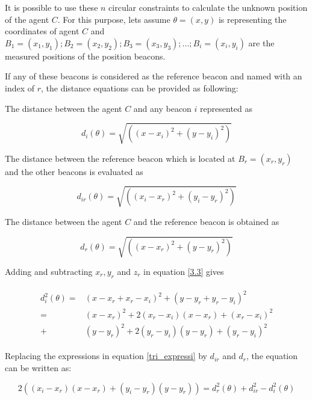 It is possible to use these $n$ circular constraints to calculate the unknown position of the agent $C$. For this purpose, lets assume $\theta = (x,y)$ is representing the coordinates of agent $C$ and $B_1 = (x_1,y_1) ; B_2 = (x_2,y_2) ; B_3 = (x_3,y_3) ; ...  ; B_i = (x_i,y_i)$ are the measured positions of the position beacons.

If any of these beacons is considered as the reference beacon and named with an index of $r$, the distance equations can be provided as following:

The distance between the agent $C$ and any beacon $i$ represented as

\begin{equation} \label{3.3}
d_i(\theta) = \sqrt{\left((x - x_i)^2 + (y - y_i)^2\right)}
\end{equation}

The distance between the reference beacon which is located at $B_r = (x_r,y_r)$ and the other beacons is evaluated as

\begin{equation}
d_{ir}(\theta) = \sqrt{\left((x_i - x_r)^2 + (y_i - y_r)^2\right)}
\end{equation}

The distance between the agent $C$ and the reference beacon is obtained as

\begin{equation}
d_r(\theta) = \sqrt{\left((x - x_r)^2 + (y - y_r)^2\right)}
\end{equation}

Adding and subtracting $x_r, y_r$ and $z_r$ in equation \ref{3.3} gives

\begin{align} \label{tri_expressi}
\begin{split}
d_i^2(\theta) = & (x - x_r + x_r - x_i)^2 + (y - y_r + y_r - y_i)^2 \\ 
              = & (x - x_r)^2 + 2(x_r - x_i)(x - x_r) + (x_r-x_i)^2 \\
              + & (y - y_r)^2 + 2(y_r - y_i)(y - y_r) + (y_r - y_i)^2
\end{split}
\end{align}

Replacing the expressions in equation \ref{tri_expressi} by $d_{ir}$ and $d_r$, the equation can be written as:

\begin{equation}
 2((x_i - x_r)(x - x_r) + (y_i - y_r)(y - y_r)) = d_r^2(\theta) + d_{ir}^2 - d_i^2(\theta)
\end{equation}

